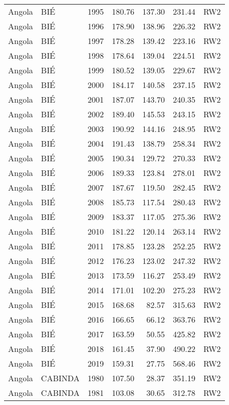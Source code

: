 \begin{longtable}{lllrrrl}
  Angola & BIÉ & 1995 & 180.76 & 137.30 & 231.44 & RW2 \\ 
  Angola & BIÉ & 1996 & 178.90 & 138.96 & 226.32 & RW2 \\ 
  Angola & BIÉ & 1997 & 178.28 & 139.42 & 223.16 & RW2 \\ 
  Angola & BIÉ & 1998 & 178.64 & 139.04 & 224.51 & RW2 \\ 
  Angola & BIÉ & 1999 & 180.52 & 139.05 & 229.67 & RW2 \\ 
  Angola & BIÉ & 2000 & 184.17 & 140.58 & 237.15 & RW2 \\ 
  Angola & BIÉ & 2001 & 187.07 & 143.70 & 240.35 & RW2 \\ 
  Angola & BIÉ & 2002 & 189.40 & 145.53 & 243.15 & RW2 \\ 
  Angola & BIÉ & 2003 & 190.92 & 144.16 & 248.95 & RW2 \\ 
  Angola & BIÉ & 2004 & 191.43 & 138.79 & 258.34 & RW2 \\ 
  Angola & BIÉ & 2005 & 190.34 & 129.72 & 270.33 & RW2 \\ 
  Angola & BIÉ & 2006 & 189.33 & 123.84 & 278.01 & RW2 \\ 
  Angola & BIÉ & 2007 & 187.67 & 119.50 & 282.45 & RW2 \\ 
  Angola & BIÉ & 2008 & 185.73 & 117.54 & 280.43 & RW2 \\ 
  Angola & BIÉ & 2009 & 183.37 & 117.05 & 275.36 & RW2 \\ 
  Angola & BIÉ & 2010 & 181.22 & 120.14 & 263.14 & RW2 \\ 
  Angola & BIÉ & 2011 & 178.85 & 123.28 & 252.25 & RW2 \\ 
  Angola & BIÉ & 2012 & 176.23 & 123.02 & 247.32 & RW2 \\ 
  Angola & BIÉ & 2013 & 173.59 & 116.27 & 253.49 & RW2 \\ 
  Angola & BIÉ & 2014 & 171.01 & 102.20 & 275.23 & RW2 \\ 
  Angola & BIÉ & 2015 & 168.68 & 82.57 & 315.63 & RW2 \\ 
  Angola & BIÉ & 2016 & 166.65 & 66.12 & 363.76 & RW2 \\ 
  Angola & BIÉ & 2017 & 163.59 & 50.55 & 425.82 & RW2 \\ 
  Angola & BIÉ & 2018 & 161.45 & 37.90 & 490.22 & RW2 \\ 
  Angola & BIÉ & 2019 & 159.31 & 27.75 & 568.46 & RW2 \\ 
  Angola & CABINDA & 1980 & 107.50 & 28.37 & 351.19 & RW2 \\ 
  Angola & CABINDA & 1981 & 103.08 & 30.65 & 312.78 & RW2 \\ 

\end{longtable}
